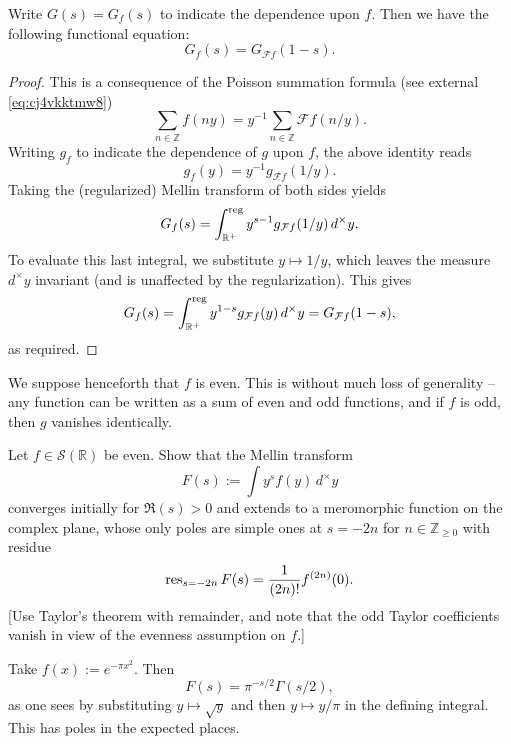 \documentclass[reqno]{amsart}  \numberwithin{theorem}{section} \numberwithin{equation}{section}
\begin{document}
\begin{lemma}\label{lemma:cj4vkjxr7m}
  Write $G(s) = G_f(s)$ to indicate the dependence upon $f$.  Then we have the following functional equation:
  \begin{equation*}
G_f(s) = G_{\mathcal{F} f}(1-s).
  \end{equation*}
\end{lemma}
\begin{proof}
  This is a consequence of the Poisson summation formula (see external \eqref{eq:cj4vkktmw8}) 
  \begin{equation*}
    \sum_{n \in \mathbb{Z} } f (n y) = y^{-1} \sum_{n \in \mathbb{Z} } \mathcal{F} f (n / y).
  \end{equation*}
  Writing $g_f$ to indicate the dependence of $g$ upon $f$, the above identity reads
  \begin{equation*}
    g_f(y) = y^{-1} g_{\mathcal{F} f}(1/y).
  \end{equation*}
  Taking the (regularized) Mellin transform of both sides yields
  \begin{equation*}
    G_f(s) = \int_{\mathbb{R}^+}^{\operatorname{reg}} y^{s-1} g_{\mathcal{F} f}(1/y) \,d^\times y.
  \end{equation*}
  To evaluate this last integral, we substitute $y \mapsto 1/y$, which leaves the measure $d^\times y$ invariant (and is unaffected by the regularization).  This gives
  \begin{equation*}
    G_f(s) = \int_{\mathbb{R}^+}^{\operatorname{reg}} y^{1-s} g_{\mathcal{F} f}(y) \,d^\times y = G_{\mathcal{F} f}(1-s),
  \end{equation*}
  as required.
\end{proof}


We suppose henceforth that $f$ is even.  This is without much loss of generality -- any function can be written as a sum of even and odd functions, and if $f$ is odd, then $g$ vanishes identically.

\begin{exercise}
  Let $f \in \mathcal{S}(\mathbb{R})$ be even.  Show that the Mellin transform
  \begin{equation*}
F(s) := \int y^s f (y) \,d^\times y
  \end{equation*}
  converges initially for $\Re(s) > 0$ and extends to a meromorphic function on the complex plane, whose only poles are simple ones at $s = - 2n$ for $n \in \mathbb{Z}_{\geq 0}$ with residue
  \begin{equation*}
\operatorname{res}_{s = - 2 n} F(s) = \frac{1}{(2 n)!} f^{(2 n)}(0).
  \end{equation*}
  [Use Taylor's theorem with remainder, and note that the odd Taylor coefficients vanish in view of the evenness assumption on $f$.]
\end{exercise}
\begin{example}
  Take $f(x) := e^{- \pi x^2}$.  Then
  \begin{equation}\label{eq:cj4vkj6hym}
F(s) = \pi^{- s / 2 } \Gamma (s / 2),
  \end{equation}
  as one sees by substituting $y \mapsto \sqrt{y}$ and then $y \mapsto y / \pi$ in the defining integral.  This has poles in the expected places.
\end{example}
\end{document}
